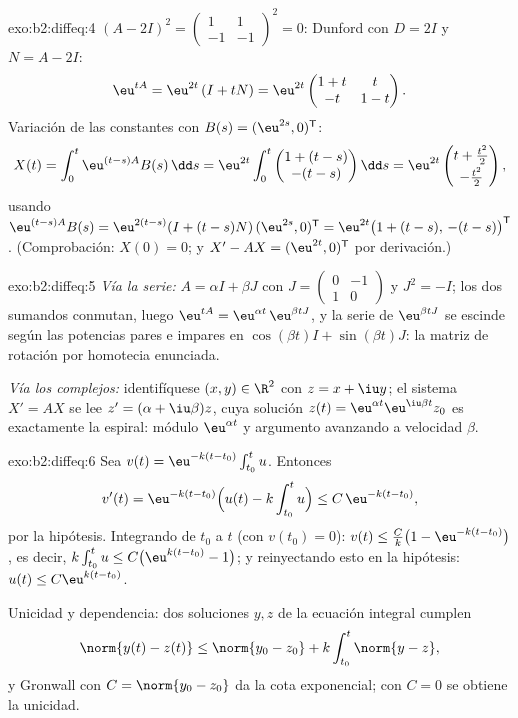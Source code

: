 \begin{solution}{exo:b2:diffeq:4}
$(A - 2I)^2 = \begin{pmatrix}1 & 1\\ -1 & -1\end{pmatrix}^2 = 0$:
Dunford con $D = 2I$ y $N = A - 2I$:
\[
\eu^{tA} = \eu^{2t}\,(I + tN)
= \eu^{2t}\begin{pmatrix} 1 + t & t\\ -t & 1 - t\end{pmatrix}.
\]
Variación de las constantes con $B(s) = (\eu^{2s}, 0)^{\mathsf T}$:
\[
X(t) = \int_0^t \eu^{(t-s)A}B(s)\,\dd s
= \eu^{2t}\int_0^t \begin{pmatrix} 1 + (t-s)\\ -(t-s)
\end{pmatrix}\dd s
= \eu^{2t}\begin{pmatrix} t + \frac{t^2}{2}\\[2pt] -\frac{t^2}{2}
\end{pmatrix},
\]
usando $\eu^{(t-s)A}B(s) = \eu^{2(t-s)}(I + (t-s)N)\,(\eu^{2s},
0)^{\mathsf T} = \eu^{2t}\bigl(1 + (t-s),\, -(t-s)\bigr)^{\mathsf
T}$. (Comprobación: $X(0) = 0$; y $X' - AX = (\eu^{2t}, 0)^{\mathsf
T}$ por derivación.)
\end{solution}

\begin{solution}{exo:b2:diffeq:5}
\emph{Vía la serie:} $A = \alpha I + \beta J$ con $J =
\begin{pmatrix}0 & -1\\ 1 & 0\end{pmatrix}$ y $J^2 = -I$; los dos
sumandos conmutan, luego $\eu^{tA} = \eu^{\alpha t}\,\eu^{\beta tJ}$,
y la serie de $\eu^{\beta t J}$ se escinde según las potencias pares
e impares en $\cos(\beta t)I + \sin(\beta t)J$: la matriz de rotación
por homotecia enunciada.

\emph{Vía los complejos:} identifíquese $(x, y) \in \R^2$ con $z = x +
\iu y$; el sistema $X' = AX$ se lee $z' = (\alpha + \iu\beta)z$, cuya
solución $z(t) = \eu^{\alpha t}\eu^{\iu\beta t}z_0$ es exactamente la
espiral: módulo $\eu^{\alpha t}$ y argumento avanzando a velocidad
$\beta$.
\end{solution}

\begin{solution}{exo:b2:diffeq:6}
Sea $v(t) = \eu^{-k(t - t_0)}\int_{t_0}^t u$. Entonces
\[
v'(t) = \eu^{-k(t-t_0)}\Bigl(u(t) - k\int_{t_0}^t u\Bigr)
\leq C\,\eu^{-k(t-t_0)},
\]
por la hipótesis. Integrando de $t_0$ a $t$ (con $v(t_0) = 0$): $v(t)
\leq \frac{C}{k}\bigl(1 - \eu^{-k(t - t_0)}\bigr)$, es decir,
$k\int_{t_0}^t u \leq C\bigl(\eu^{k(t-t_0)} - 1\bigr)$; y
reinyectando esto en la hipótesis: $u(t) \leq C\eu^{k(t-t_0)}$.

Unicidad y dependencia: dos soluciones $y, z$ de la ecuación integral
cumplen
\[
\norm{y(t) - z(t)} \leq \norm{y_0 - z_0} +
k\int_{t_0}^{t}\norm{y - z},
\]
y Gronwall con $C = \norm{y_0 - z_0}$ da la cota exponencial; con $C
= 0$ se obtiene la unicidad.
\end{solution}

